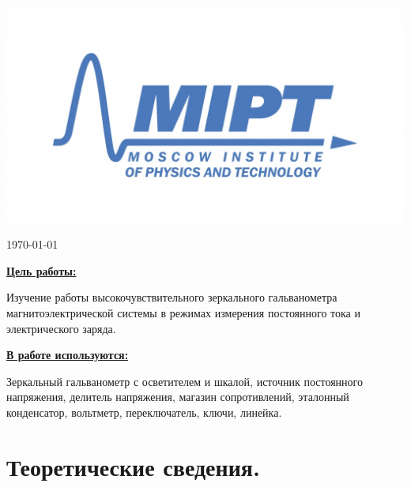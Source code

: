 \documentclass[a4paper, 12pt, twoside]{article}
\newenvironment{bottompar}{\par\vspace*{\fill}}{\clearpage}
\begin{document}
\begin{titlepage}
\begin{bottompar}
	\begin{center}
		\includegraphics[width = 80 mm]{logo.jpg}
	\end{center}
	{\large \today}

\end{bottompar}
\vfill %

\end{titlepage}

{\Large \uline { \textbf  {Цель работы:}}}

\vspace{2mm}
Изучение работы высокочувствительного зеркального гальванометра магнитоэлектрической системы в режимах измерения постоянного тока и электрического заряда.
\vspace{\baselineskip}

{\Large \uline { \textbf  {В работе используются:}}}

\vspace{2mm}

Зеркальный гальванометр с осветителем и шкалой, источник постоянного напряжения, делитель напряжения, магазин сопротивлений, эталонный конденсатор, вольтметр, переключатель, ключи, линейка.

\section{Теоретические сведения.}
\end{document}
